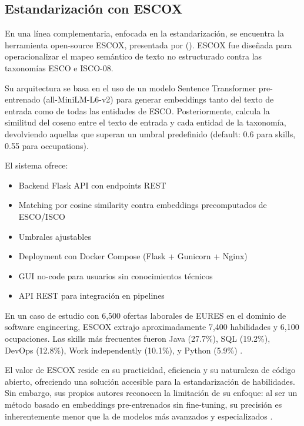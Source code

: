 \subsection{Estandarización con ESCOX}

En una línea complementaria, enfocada en la estandarización, se encuentra la herramienta open-source ESCOX, presentada por \citeauthor{kavargyris2025} (\citeyear{kavargyris2025}). ESCOX fue diseñada para operacionalizar el mapeo semántico de texto no estructurado contra las taxonomías ESCO e ISCO-08.

Su arquitectura se basa en el uso de un modelo Sentence Transformer pre-entrenado (all-MiniLM-L6-v2) para generar embeddings tanto del texto de entrada como de todas las entidades de ESCO. Posteriormente, calcula la similitud del coseno entre el texto de entrada y cada entidad de la taxonomía, devolviendo aquellas que superan un umbral predefinido (default: 0.6 para skills, 0.55 para occupations).

El sistema ofrece:

\begin{itemize}
    \item Backend Flask API con endpoints REST
    \item Matching por cosine similarity contra embeddings precomputados de ESCO/ISCO
    \item Umbrales ajustables
    \item Deployment con Docker Compose (Flask + Gunicorn + Nginx)
    \item GUI no-code para usuarios sin conocimientos técnicos
    \item API REST para integración en pipelines
\end{itemize}

En un caso de estudio con 6,500 ofertas laborales de EURES en el dominio de software engineering, ESCOX extrajo aproximadamente 7,400 habilidades y 6,100 ocupaciones. Las skills más frecuentes fueron Java (27.7\%), SQL (19.2\%), DevOps (12.8\%), Work independently (10.1\%), y Python (5.9\%) \parencite{kavargyris2025}.

El valor de ESCOX reside en su practicidad, eficiencia y su naturaleza de código abierto, ofreciendo una solución accesible para la estandarización de habilidades. Sin embargo, sus propios autores reconocen la limitación de su enfoque: al ser un método basado en embeddings pre-entrenados sin fine-tuning, su precisión es inherentemente menor que la de modelos más avanzados y especializados \parencite{kavargyris2025}.

